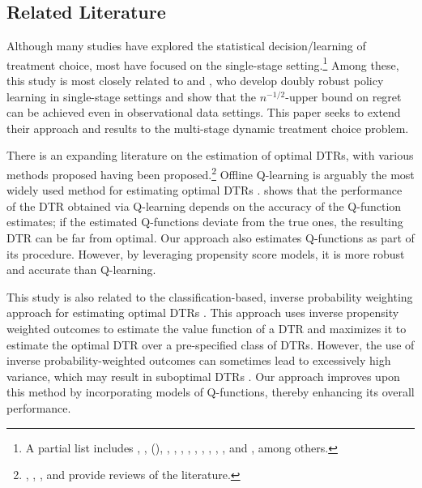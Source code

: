 
\subsection*{Related Literature \label{sec:related literature}}

Although many studies have explored the statistical decision/learning of treatment choice, most have focused on the single-stage setting.\footnote{A partial list includes \cite{Manski_2004}, \cite{Hirano_Porter_2009}, \citeauthor{Stoye_2009} (\citeyear{Stoye_2009,Stoye_2012}), \cite{Qian_Murphy_2011}, \cite{Bhattacharya_Dupas_2012}, \cite{Tetenov_2012}, \cite{Zhao_et_al_2012}, \cite{Kitagawa_Tetenov_2018a}, \cite{Athey_Wager_2020}, \cite{Mbakop_Tabord-Meehan_2019}, \cite{kitagawa_et_al_2021}, \cite{zhou2022offline}, and \cite{viviano_2024}, among others.} 
Among these, this study is most closely related to \cite{Athey_Wager_2020} and \cite{zhou2022offline}, who develop doubly robust policy learning in single-stage settings and show that the $n^{-1/2}$-upper bound on regret can be achieved even in observational data settings. This paper seeks to extend their approach and results to the multi-stage dynamic treatment choice problem.

There is an expanding literature on the estimation of optimal DTRs, with various methods proposed having been proposed.\footnote{\cite{Chakraborty_Murphy_2014}, \cite{Laber_et_al_2014}, \cite{Kosorok_et_al_2019}, and \cite{Li_et_al_2023} provide reviews of the literature.} Offline Q-learning \citep{Watkins_Dayan_1992} is arguably the most widely used method for estimating optimal DTRs \citep[e.g.,][]{Murphy_2005,Moodie_et_al_2012,Zhang_et_al_2018}. \cite{Murphy_2005} shows that the performance of the DTR obtained via Q-learning depends on the accuracy of the Q-function estimates; if the estimated Q-functions deviate from the true ones, the resulting DTR can be far from optimal.
Our approach also estimates Q-functions as part of its procedure. However, by leveraging propensity score models, it is more robust and accurate than Q-learning.

This study is also related to the classification-based, inverse probability weighting approach for estimating optimal DTRs \citep[e.g.,][]{Zhao_et_al_2015, Sakaguchi_2021}. This approach uses inverse propensity weighted outcomes to estimate the value function of a DTR and maximizes it to estimate the optimal DTR over a pre-specified class of DTRs. However, the use of inverse probability-weighted outcomes can sometimes lead to excessively high variance, which may result in suboptimal DTRs \citep{Doroudi_et_al_2018}. Our approach improves upon this method by incorporating models of Q-functions, thereby enhancing its overall performance.




